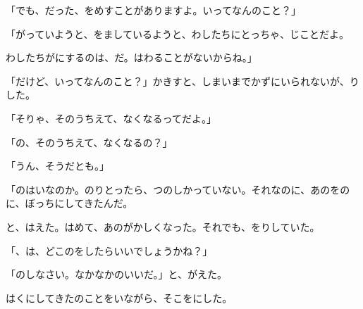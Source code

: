 「でも、だった、をめすことがありますよ。いってなんのこと？」

「がっていようと、をましているようと、わしたちにとっちゃ、じことだよ。

わしたちがにするのは、だ。はわることがないからね。」

「だけど、いってなんのこと？」かきすと、しまいまでかずにいられないが、りした。

「そりゃ、そのうちえて、なくなるってだよ。」

「の、そのうちえて、なくなるの？」

「うん、そうだとも。」

「のはいなのか。のりとったら、つのしかっていない。それなのに、あのをのに、ぼっちにしてきたんだ。

と、はえた。はめて、あのがかしくなった。それでも、をりしていた。

「、は、どこのをしたらいいでしょうかね？」

「のしなさい。なかなかのいいだ。」と、がえた。

はくにしてきたのことをいながら、そこをにした。


